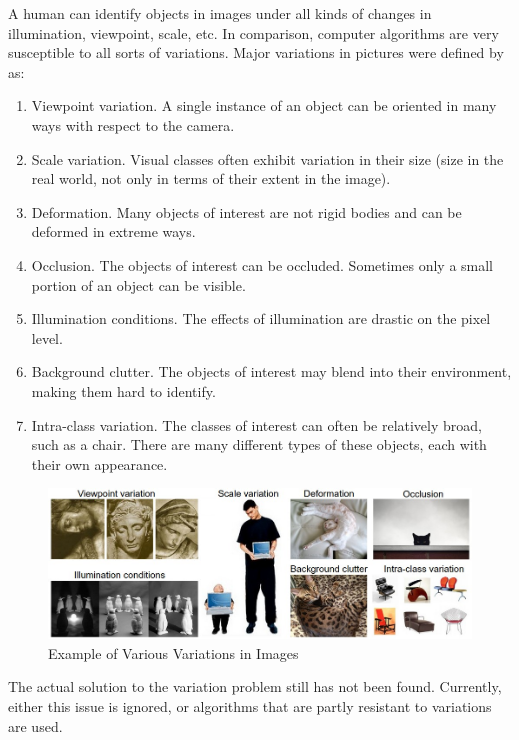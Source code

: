 A human can identify objects in images under all kinds of changes in illumination, viewpoint, scale, etc. In comparison, computer algorithms are very susceptible to all sorts of variations. Major variations in pictures were defined by \cite{231n} as:

\begin{enumerate}
\item Viewpoint variation. A single instance of an object can be oriented in many ways with respect to the camera.
\item Scale variation. Visual classes often exhibit variation in their size (size in the real world, not only in terms of their extent in the image).
\item Deformation. Many objects of interest are not rigid bodies and can be deformed in extreme ways.
\item Occlusion. The objects of interest can be occluded. Sometimes only a small portion of an object can be visible.
\item Illumination conditions. The effects of illumination are drastic on the pixel level.
\item Background clutter. The objects of interest may blend into their environment, making them hard to identify.
\item Intra-class variation. The classes of interest can often be relatively broad, such as a chair. There are many different types of these objects, each with their own appearance.
\end{enumerate}


 \begin{figure}[h]
\centering
\includegraphics[width=14cm]{Figures/2/challenges.jpeg}
\caption{Example of Various Variations in Images \citep{231n}}
\label{fig:imgnet}
\end{figure}

The actual solution to the variation problem still has not been found. Currently,  either this issue is ignored, or algorithms that are partly resistant to variations are used.

